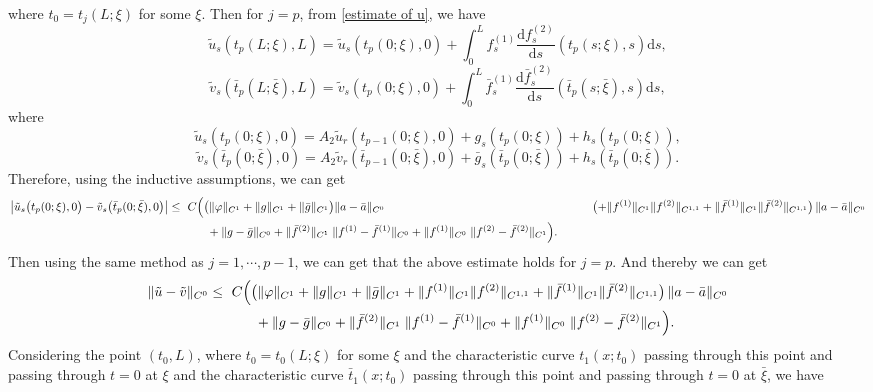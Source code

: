 \documentclass[a4paper,reqno,11pt]{amsart}
\numberwithin{equation}{section} %
\begin{document}
where $t_0=t_j(L;\xi)$ for some $\xi$. Then for $j=p$, from \eqref{estimate of u}, we have
$$
\tilde{u}_s\left( t_p\left( L;\xi \right) ,L \right) =\tilde{u}_s\left( t_p\left( 0;\xi \right) ,0 \right) +\int_{0}^L{f_{s}^{(1)}\frac{\mathrm{d}f_{s}^{(2)}}{\mathrm{d}s}\left( t_p\left( s;\xi \right) ,s \right) \mathrm{d}s},
$$
$$
\tilde{v}_s\left( \bar{t}_p\left( L;\bar{\xi} \right) ,L \right) =\tilde{v}_s\left( t_p\left( 0;\xi \right) ,0 \right) +\int_{0 }^L{\bar{f}_{s}^{(1)}\frac{\mathrm{d}\bar{f}_{s}^{(2)}}{\mathrm{d}s}\left( \bar{t}_p\left( s;\bar{\xi} \right) ,s \right) \mathrm{d}s},
$$
where
$$
\tilde{u}_s\left( t_p\left( 0;\xi \right) ,0 \right) =A_2\tilde{u}_r\left( t_{p-1}\left( 0;\xi \right) ,0 \right) +g_s\left( t_p(0;\xi ) \right) +h_s\left( t_p(0;\xi ) \right) ,
$$
$$
\tilde{v}_s\left( \bar{t}_p\left( 0;\bar{\xi} \right) ,0 \right) =A_2\tilde{v}_r\left( \bar{t}_{p-1}\left( 0;\bar{\xi} \right) ,0 \right) +\bar{g}_s\left( \bar{t}_p(0;\bar{\xi}) \right) +h_s\left( \bar{t}_p(0;\bar{\xi}) \right) .
$$
Therefore, using the inductive assumptions, we can get 
$$
\begin{aligned}
\bigl\lvert \tilde u_s\bigl(t_p(0;\xi),0\bigr)- \tilde v_s\bigl(\bar t_p(0;\bar\xi),0\bigr)\bigr\rvert
\le{}&\ C\Bigl(
  \bigl(\|\varphi\|_{C^{1}}+\|g\|_{C^{1}}+\|\bar g\|_{C^{1}}\bigr) \|a-\bar a\|_{C^{0}} \Bigr.
&\qquad   \bigl(+ \|f^{(1)}\|_{C^{1}}\|f^{(2)}\|_{C^{1,1}}
   + \|\bar f^{(1)}\|_{C^{1}}\|\bar f^{(2)}\|_{C^{1,1}}\bigr)\,
   \|a-\bar a\|_{C^{0}}\\
&\qquad + \Bigl. \|g-\bar g\|_{C^{0}}
  + \|\bar f^{(2)}\|_{C^{1}}\;\|f^{(1)}-\bar f^{(1)}\|_{C^{0}}
  + \|f^{(1)}\|_{C^{0}}\;\|f^{(2)}-\bar f^{(2)}\|_{C^{1}}
\Bigr).
\end{aligned}
$$
Then using the same method as $j=1,\cdots,p-1$, we can get that the above estimate holds for $j=p$. And thereby we can get
$$
\begin{aligned}
\|\tilde u-\tilde v\|_{C^{0}}
\le{}&\ C\Bigl(
  \bigl(\|\varphi\|_{C^{1}}+\|g\|_{C^{1}}+\|\bar g\|_{C^{1}}
  + \|f^{(1)}\|_{C^{1}}\|f^{(2)}\|_{C^{1,1}}
  + \|\bar f^{(1)}\|_{C^{1}}\|\bar f^{(2)}\|_{C^{1,1}}\bigr)\,
  \|a-\bar a\|_{C^{0}} \\
&\qquad + \|g-\bar g\|_{C^{0}}
  + \|\bar f^{(2)}\|_{C^{1}}\;\|f^{(1)}-\bar f^{(1)}\|_{C^{0}}
  + \|f^{(1)}\|_{C^{0}}\;\|f^{(2)}-\bar f^{(2)}\|_{C^{1}}
\Bigr).
\end{aligned}
$$
Considering the point $(t_0,L)$, where $t_0=t_0(L;\xi)$ for some $\xi$ and the characteristic curve $t_1(x;t_0)$ passing through this point and passing through $t=0$ at $\xi$ and the characteristic curve $\bar{t}_1(x;t_0)$ passing through this point and passing through $t=0$ at $\bar{\xi}$, we have
\end{document}
